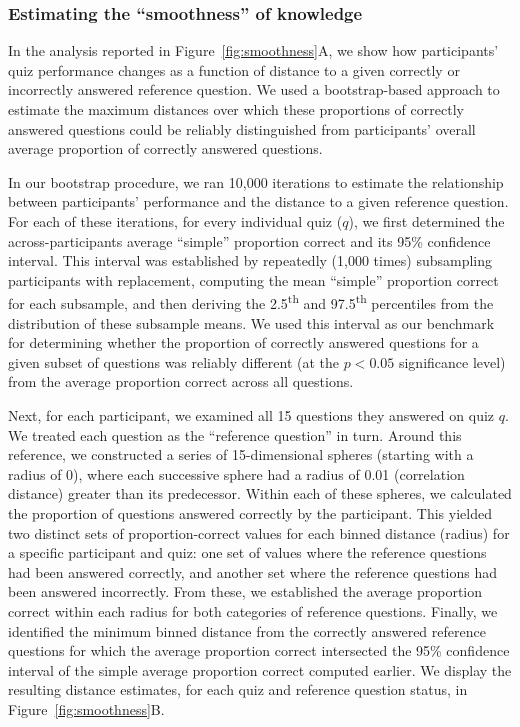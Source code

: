 \documentclass[10pt]{article}
\begin{document}
\subsubsection*{Estimating the ``smoothness'' of knowledge}\label{subsec:smoothness}

In the analysis reported in Figure~\ref{fig:smoothness}A, we show how
participants' quiz performance changes as a function of distance to a given
correctly or incorrectly answered reference question. We used a bootstrap-based
approach to estimate the maximum distances over which these proportions
of correctly answered questions could be reliably distinguished from participants'
overall average proportion of correctly answered questions.

In our bootstrap procedure, we ran 10,000 iterations to estimate the
relationship between participants' performance and the distance to a given
reference question. For each of these iterations, for every individual quiz
($q$), we first determined the across-participants average ``simple''
proportion correct and its 95\% confidence interval. This interval was
established by repeatedly (1,000 times) subsampling participants with
replacement, computing the mean ``simple'' proportion correct for each
subsample, and then deriving the 2.5\textsuperscript{th} and
97.5\textsuperscript{th} percentiles from the distribution of these subsample
means. We used this interval as our benchmark for determining whether the
proportion of correctly answered questions for a given subset of questions was
reliably different (at the $p < 0.05$ significance level) from the average
proportion correct across all questions.

Next, for each participant, we examined all 15 questions they answered on quiz
$q$. We treated each question as the ``reference question'' in turn. Around
this reference, we constructed a series of 15-dimensional spheres (starting
with a radius of 0), where each successive sphere had a radius of 0.01
(correlation distance) greater than its predecessor. Within each of these
spheres, we calculated the proportion of questions answered correctly by the
participant. This yielded two distinct sets of proportion-correct values for
each binned distance (radius) for a specific participant and quiz: one set of
values where the reference questions had been answered correctly, and another
set where the reference questions had been answered incorrectly. From these, we
established the average proportion correct within each radius for both
categories of reference questions. Finally, we identified the minimum binned
distance from the correctly answered reference questions for which the average
proportion correct intersected the 95\% confidence interval of the simple
average proportion correct computed earlier. We display the resulting distance
estimates, for each quiz and reference question status, in
Figure~\ref{fig:smoothness}B.
\end{document}
